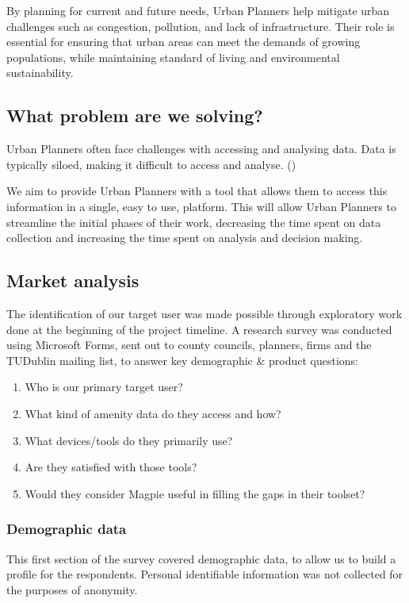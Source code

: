 \documentclass[preview]{standalone}
\begin{document}
By planning for current and future needs, Urban Planners help mitigate urban
challenges such as congestion, pollution, and lack of infrastructure. Their role
is essential for ensuring that urban areas can meet the demands of growing
populations, while maintaining standard of living and environmental
sustainability.

\subsection{What problem are we solving?}
Urban Planners often face challenges with accessing and analysing data. Data is
typically siloed, making it difficult to access and analyse.
(\cite{duivenvoorden2021managing})

We aim to provide Urban Planners with a tool that allows them to access this
information in a single, easy to use, platform. This will allow Urban Planners
to streamline the initial phases of their work, decreasing the time spent on
data collection and increasing the time spent on analysis and decision making.

\subsection{Market analysis}
The identification of our target user was made possible through exploratory work
done at the beginning of the project timeline. A research survey was conducted
using Microsoft Forms, sent out to county councils, planners, firms and the
TUDublin mailing list, to answer key demographic \& product questions:
\begin{enumerate}
    \item{Who is our primary target user?}
    \item{What kind of amenity data do they access and how?}
    \item{What devices/tools do they primarily use?}
    \item{Are they satisfied with those tools?}
    \item{Would they consider Magpie useful in filling the gaps in their toolset?}
\end{enumerate}

\newpage{}

\subsubsection{Demographic data}
This first section of the survey covered demographic data, to allow us to build a profile for the respondents. Personal identifiable information was not collected for the purposes of anonymity.
\end{document}
